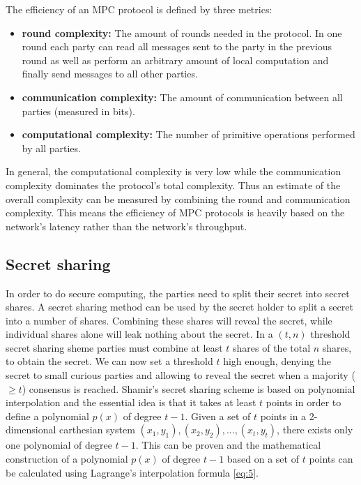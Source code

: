 The efficiency of an MPC protocol is defined by three metrics:
\begin{itemize}
  \item \textbf{round complexity:} The amount of rounds needed in the protocol. In one round each party can read all messages sent to the party in the previous round as well as perform an arbitrary amount of local computation and finally send messages to all other parties.
  \item \textbf{communication complexity:} The amount of communication between all parties (measured in bits).
  \item \textbf{computational complexity:} The number of primitive operations performed by all parties.
\end{itemize}
In general, the computational complexity is very low while the communication complexity dominates the protocol's total complexity. Thus an estimate of the overall complexity can be measured by combining the round and communication complexity. This means the efficiency of MPC protocols  is heavily based on the network's latency rather than the network's throughput.

\subsection{Secret sharing}
\label{Secret sharing}
In order to do secure computing, the parties need to split their secret into secret shares. A secret sharing method can be used by the secret holder to split a secret into a number of shares. Combining these shares will reveal the secret, while individual shares alone will leak nothing about the secret. In a $(t,n)$ threshold secret sharing sheme parties must combine at least $t$ shares of the total $n$ shares, to obtain the secret. We can now set a threshold $t$ high enough, denying the secret to small curious parties and allowing to reveal the secret when a majority ($\geq t$) consensus is reached. Shamir's secret sharing scheme \cite{shamir1979share} is based on polynomial interpolation and the essential idea is that it takes at least $t$ points in order to define a polynomial $p(x)$ of degree $t-1$. Given a set of $t$ points in a 2-dimensional carthesian system  $(x_1, y_1), (x_2, y_2), ..., (x_t,y_t)$, there exists only one polynomial of degree $t-1$. This can be proven and the mathematical construction of a polynomial $p(x)$ of degree $t-1$ based on a set of $t$ points can be calculated using Lagrange's interpolation formula \ref{eq:5}.

